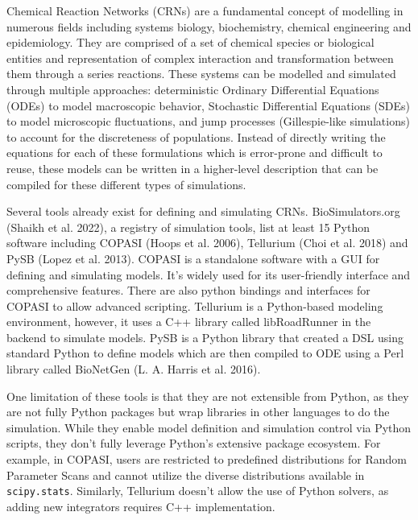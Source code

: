 \documentclass[
  letterpaper,
  DIV=11,
  numbers=noendperiod]{scrartcl}
\begin{document}
Chemical Reaction Networks (CRNs) are a fundamental concept of modelling
in numerous fields including systems biology, biochemistry, chemical
engineering and epidemiology. They are comprised of a set of chemical
species or biological entities and representation of complex interaction
and transformation between them through a series reactions. These
systems can be modelled and simulated through multiple approaches:
deterministic Ordinary Differential Equations (ODEs) to model
macroscopic behavior, Stochastic Differential Equations (SDEs) to model
microscopic fluctuations, and jump processes (Gillespie-like
simulations) to account for the discreteness of populations. Instead of
directly writing the equations for each of these formulations which is
error-prone and difficult to reuse, these models can be written in a
higher-level description that can be compiled for these different types
of simulations.

Several tools already exist for defining and simulating CRNs.
BioSimulators.org (Shaikh et al. 2022), a registry of simulation tools,
list at least 15 Python software including COPASI (Hoops et al. 2006),
Tellurium (Choi et al. 2018) and PySB (Lopez et al. 2013). COPASI is a
standalone software with a GUI for defining and simulating models. It's
widely used for its user-friendly interface and comprehensive features.
There are also python bindings and interfaces for COPASI to allow
advanced scripting. Tellurium is a Python-based modeling environment,
however, it uses a C++ library called libRoadRunner in the backend to
simulate models. PySB is a Python library that created a DSL using
standard Python to define models which are then compiled to ODE using a
Perl library called BioNetGen (L. A. Harris et al. 2016).

One limitation of these tools is that they are not extensible from
Python, as they are not fully Python packages but wrap libraries in
other languages to do the simulation. While they enable model definition
and simulation control via Python scripts, they don't fully leverage
Python's extensive package ecosystem. For example, in COPASI, users are
restricted to predefined distributions for Random Parameter Scans and
cannot utilize the diverse distributions available in
\texttt{scipy.stats}. Similarly, Tellurium doesn't allow the use of
Python solvers, as adding new integrators requires C++ implementation.
\end{document}
